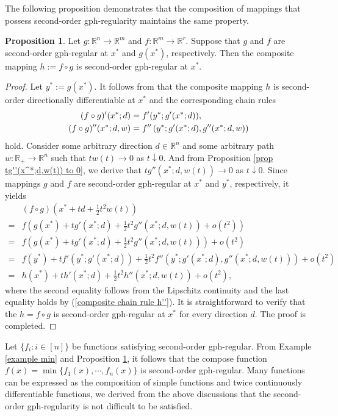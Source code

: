 \documentclass[11pt]{article}
\theoremstyle{definition}
\newtheorem{proposition}[theorem]{Proposition}
\theoremstyle{remark}
\numberwithin{equation}{section}
\begin{document}
The following proposition demonstrates that the composition of mappings that possess second-order gph-regularity  maintains the same property.


\begin{proposition}\label{prop a composition second-order gph-regular}
Let $g:\mathbb{R}^n\to \mathbb{R}^m$ and $f:\mathbb{R}^m\to
\mathbb{R}^r$.
 Suppose that $g$ and $f$  are second-order gph-regular at $x^*$ and $g(x^*)$, respectively. Then
the composite mapping $h:=f\circ g$ is second-order gph-regular at
$x^*$.
\end{proposition}

\begin{proof}
Let $y^*:=g(x^*)$.  It follows from \cite[Propositions 2.47 and 2.53]{Bonnans} that the composite
mapping $h$ is second-order directionally differentiable at $x^*$ and the corresponding
chain rules
\begin{align}\label{composite chain rule h''}
(f\circ g)'(x^*;d)&=f'(y^*;g'(x^*;d)),\\
  (f\circ g)''(x^*;d,w)&=f''\left(y^*;g'(x^*;d),g''(x^*;d,w)\right)\notag
\end{align}
hold.  Consider some arbitrary direction $d\in \mathbb{R}^n$ and some arbitrary path $w:\mathbb{R}_{+}\to \mathbb{R}^n$ such that
 $tw(t)\to 0$ as $t\downarrow 0$.
 And from Proposition \ref{prop tg''(x^*;d,w(t)) to 0}, we derive that
      $tg''(x^*;d,w(t))\to 0$ as $t\downarrow 0$.
 Since mappings $g$ and $f$ are second-order gph-regular at $x^*$ and $y^*$, respectively,
  it yields
\begin{align*}
&(f\circ g)\left(x^*+td+\frac{1}{2}t^2w(t)\right)\\
=&f\left(g(x^*)+tg'(x^*;d)+\frac{1}{2}t^2g''(x^*;d,w(t))+o(t^2)\right)\\
=& f\left(g(x^*)+tg'(x^*;d)+\frac{1}{2}t^2g''(x^*;d,w(t))\right) + o(t^2)\\
  =&f(y^*)+tf'(y^*;g'(x^*;d))+\frac{1}{2}t^2f''\left(y^*;g'(x^*;d),g''(x^*;d,w(t))\right)+o(t^2)\\
  =&h(x^*)+th'(x^*;d)+\frac{1}{2}t^2h''(x^*;d,w(t))+o(t^2),
\end{align*}
where  the second equality follows from the Lipschitz continuity and
 the last equality holds by (\ref{composite chain rule h''}). It is straightforward to verify that the
$h=f\circ g$ is
second-order gph-regular at $x^*$ for every direction $d$. The proof is completed.
\end{proof}

Let $\{f_i:i\in [n]\}$ be functions  satisfying    second-order gph-regular. From   Example \ref{example min} and   Proposition \ref{prop a composition second-order gph-regular}, it follows that the
 compose function $f(x)=\min\{f_1(x),\cdots,f_n(x)\}$ is  second-order gph-regular.  Many functions can be expressed as the composition of  simple functions and twice continuously differentiable functions, we derived  from the above discussions that the second-order gph-regularity is not difficult to be satisfied.
\end{document}
